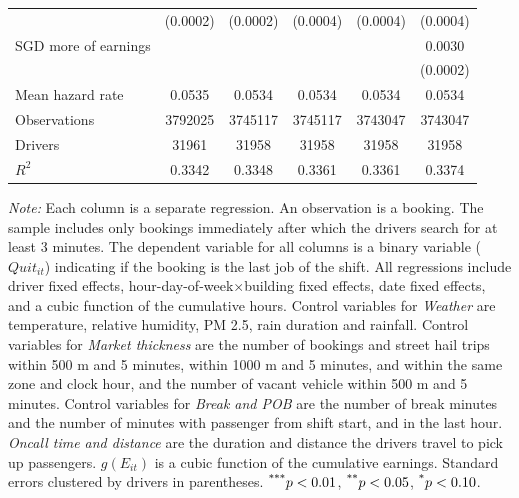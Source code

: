 \documentclass[reviewmode]{restat}
\begin{document}
\begin{table}[]
{\begin{tabularx}{\textwidth}{l@{\extracolsep{\fill}}*{5}{S[table-format = 0.4, table-space-text-pre={**}, table-space-text-post={-**}]}}
                &    (0.0002)         &    (0.0002)         &    (0.0004)         &    (0.0004)         &    (0.0004)         \\
     SGD more of earnings&                     &                     &                     &                     &      0.0030\sym{***}         \\
                &                     &                     &                     &                     &    (0.0002)         \\
    \midrule
    Mean hazard rate&      0.0535         &      0.0534         &      0.0534         &      0.0534         &      0.0534         \\
    Observations&\num{3792025}         &\num{3745117}         &\num{3745117}         &\num{3743047}         &\num{3743047}         \\
    Drivers     & \num{31961}         & \num{31958}         & \num{31958}         & \num{31958}         & \num{31958}         \\
    \(R^2\)     &      0.3342         &      0.3348         &      0.3361         &      0.3361         &      0.3374         \\
    \bottomrule
    \end{tabularx}
    }
	\begin{tablenotes}
	\small
        \textit{Note:} Each column is a separate regression. An observation is a booking. The sample includes only bookings immediately after which the drivers search for at least 3 minutes. The dependent variable for all columns is a binary variable ($Quit_{it}$) indicating if the booking is the last job of the shift. All regressions include driver fixed effects, hour-day-of-week\(\times\)building fixed effects, date fixed effects, and a cubic function of the cumulative hours. Control variables for \textit{Weather} are temperature, relative humidity, PM 2.5, rain duration and rainfall. Control variables for \textit{Market thickness} are the number of bookings and street hail trips within 500 m and 5 minutes, within 1000 m and 5 minutes, and within the same zone and clock hour, and the number of vacant vehicle within 500 m and 5 minutes. Control variables for \textit{Break and POB} are the number of break minutes and the number of minutes with passenger from shift start, and in the last hour. \textit{Oncall time and distance} are the duration and distance the drivers travel to pick up passengers. \(g(E_{it})\) is a cubic function of the cumulative earnings. Standard errors clustered by drivers in parentheses. $\textsuperscript{***}p < 0.01$, $\textsuperscript{**}p < 0.05$, $\textsuperscript{*}p < 0.10$. 
	\end{tablenotes}
\end{table}
\end{document}
